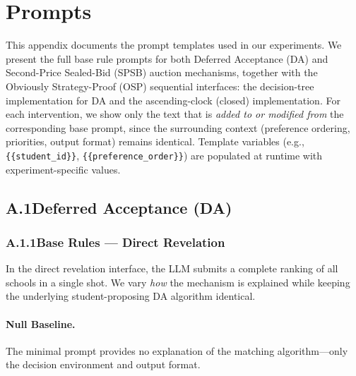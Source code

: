 
\section{Prompts}
\label{sec:appendix-prompts}

This appendix documents the prompt templates used in our experiments. We present the full base rule prompts for both Deferred Acceptance (DA) and Second-Price Sealed-Bid (SPSB) auction mechanisms, together with the Obviously Strategy-Proof (OSP) sequential interfaces: the \citet{ashlagi2018stable} decision-tree implementation for DA and the \citet{breitmoser2022obviousness} ascending-clock (closed) implementation. 
For each intervention, we show only the text that is \emph{added to or modified from} the corresponding base prompt, since the surrounding context (preference ordering, priorities, output format) remains identical. Template variables (e.g., \texttt{\{\{student\_id\}\}}, \texttt{\{\{preference\_order\}\}}) are populated at runtime with experiment-specific values.

\subsection*{A.1\quad Deferred Acceptance (DA)}

\subsubsection*{A.1.1\quad Base Rules --- Direct Revelation}

In the direct revelation interface, the LLM submits a complete ranking of all schools in a single shot. We vary \emph{how} the mechanism is explained while keeping the underlying student-proposing DA algorithm identical.

\paragraph{Null Baseline.}
The minimal prompt provides no explanation of the matching algorithm---only the decision environment and output format.

